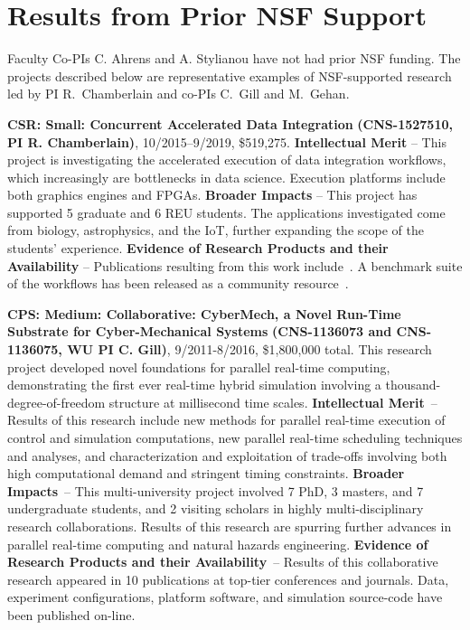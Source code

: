\section{Results from Prior NSF Support}
\label{sec:prior}

Faculty Co-PIs C. Ahrens and A. Stylianou have not had prior NSF funding.
The projects described
below are representative examples of NSF-supported research led by PI 
R.~Chamberlain and co-PIs C.~Gill and M.~Gehan.

{\bf CSR: Small: Concurrent Accelerated Data Integration}
{\bf (CNS-1527510,
PI R. Chamberlain)}, 
10/2015--9/2019, \$519,275.  
%
\textbf{Intellectual Merit} -- This project is investigating the
accelerated execution of data integration workflows, which
increasingly are bottlenecks in data science. Execution platforms
include both graphics engines and FPGAs.
%
\textbf{Broader Impacts} -- This project has supported 5
graduate and 6 REU students.  The applications investigated
come from biology, astrophysics, and the IoT,
further expanding the scope of the students'
experience.
%
\textbf{Evidence of Research Products and their Availability} --
Publications resulting from this work include~\cite{cc19,ccb19,dibs,c17,fcbmc19,mgc16,js16}.
A benchmark suite of the workflows has been released
as a community resource~\cite{dibsv1}.

{\bf CPS: Medium: Collaborative: CyberMech, a Novel Run-Time Substrate for 
Cyber-Mechanical Systems}
{\bf (CNS-1136073 and CNS-1136075,
WU PI C. Gill)}, 9/2011-8/2016, \$1,800,000 total.  
%
This research project developed novel foundations for parallel real-time computing, demonstrating the first ever real-time hybrid simulation involving a thousand-degree-of-freedom structure at millisecond time scales.
%
\textbf{Intellectual Merit}~-- Results of this research include new methods for parallel real-time execution of control and simulation computations, new parallel real-time scheduling techniques and analyses, and characterization and exploitation of trade-offs involving both high computational demand and stringent timing constraints.
%
\textbf{Broader Impacts}~-- This multi-university project involved 7 PhD, 3 masters, and 7 undergraduate students, and 2 visiting scholars in highly multi-disciplinary research collaborations.  Results of this research are spurring
further advances in parallel real-time computing and natural hazards
engineering.
%
\textbf{Evidence of Research Products and their Availability}~-- Results of
this 
collaborative research appeared in 10 publications at
top-tier conferences and journals.
Data, experiment configurations, platform software, and simulation source-code 
have been published on-line. %

